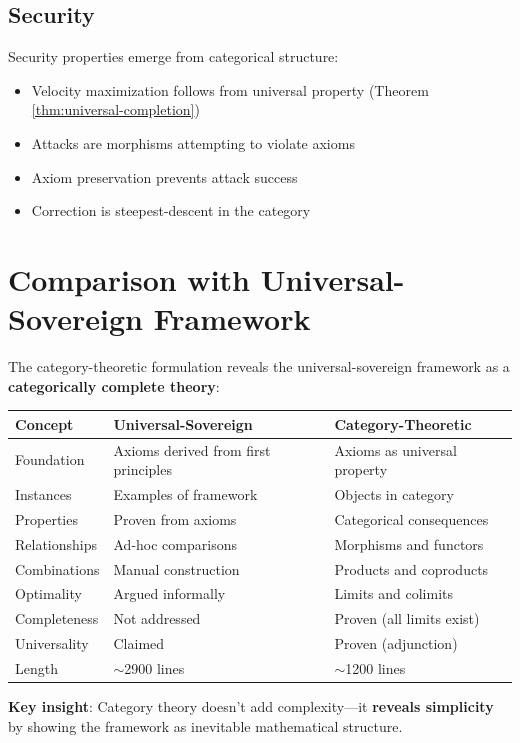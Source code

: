 \documentclass[11pt,a4paper]{article}
\theoremstyle{definition}
\theoremstyle{remark}
\begin{document}
\subsection{Security}

Security properties emerge from categorical structure:
\begin{itemize}
\item Velocity maximization follows from universal property (Theorem \ref{thm:universal-completion})
\item Attacks are morphisms attempting to violate axioms
\item Axiom preservation prevents attack success
\item Correction is steepest-descent in the category
\end{itemize}

\section{Comparison with Universal-Sovereign Framework}

The category-theoretic formulation reveals the universal-sovereign framework as a \textbf{categorically complete theory}:

\begin{center}
\begin{tabular}{lll}
\toprule
\textbf{Concept} & \textbf{Universal-Sovereign} & \textbf{Category-Theoretic} \\
\midrule
Foundation & Axioms derived from first principles & Axioms as universal property \\
Instances & Examples of framework & Objects in category \\
Properties & Proven from axioms & Categorical consequences \\
Relationships & Ad-hoc comparisons & Morphisms and functors \\
Combinations & Manual construction & Products and coproducts \\
Optimality & Argued informally & Limits and colimits \\
Completeness & Not addressed & Proven (all limits exist) \\
Universality & Claimed & Proven (adjunction) \\
\midrule
Length & $\sim$2900 lines & $\sim$1200 lines \\
\bottomrule
\end{tabular}
\end{center}

\textbf{Key insight}: Category theory doesn't add complexity—it \textbf{reveals simplicity} by showing the framework as inevitable mathematical structure.
\end{document}
